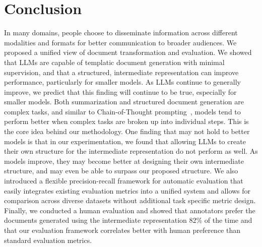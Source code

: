 \section{Conclusion}

In many domains, people choose to disseminate information across different modalities and formats for better communication to broader audiences. We proposed a unified view of document transformation and evaluation. We showed that LLMs are capable of templatic document generation with minimal supervision, and that a structured, intermediate representation can improve performance, particularly for smaller models. As LLMs continue to generally improve, we predict that this finding will continue to be true, especially for smaller models. Both summarization and structured document generation are complex tasks, and similar to Chain-of-Thought prompting~\cite{Wei2022ChainOT}, models tend to perform better when complex tasks are broken up into individual steps. This is the core idea behind our methodology. One finding that may not hold to better models is that in our experimentation, we found that allowing LLMs to create their own structure for the intermediate representation do not perform as well. As models improve, they may become better at designing their own intermediate structure, and may even be able to surpass our proposed structure.
We also introduced a flexible precision-recall framework for automatic evaluation that easily integrates existing evaluation metrics into a unified system and allows for comparison across diverse datasets without additional task specific metric design. Finally, we conducted a human evaluation and showed that annotators prefer the documents generated using the intermediate representation 82\% of the time and that our evaluation framework correlates better with human preference than standard evaluation metrics.